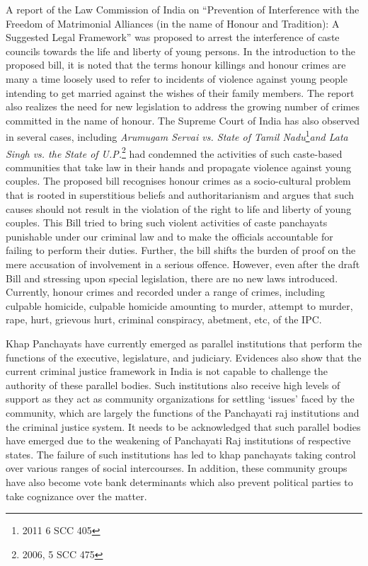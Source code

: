 \begin{multicols}{2}
\noi
A report of the Law Commission of India on “Prevention of Interference with the
Freedom of Matrimonial Alliances (in the name of Honour and Tradition): A Suggested
Legal Framework” was proposed to arrest the interference of caste councils towards the
life and liberty of young persons. In the introduction to the proposed bill, it is noted that
the terms honour killings and honour crimes are many a time loosely used to refer to
incidents of violence against young people intending to get married against the wishes
of their family members. The report also realizes the need for new legislation to address
the growing number of crimes committed in the name of honour. The Supreme Court
of India has also observed in several cases, including \textit{Arumugam Servai vs. State of
Tamil Nadu}\footnote{ 2011 6 SCC 405}\textit{and Lata Singh vs. the State of U.P.}\footnote{2006, 5 SCC 475} had condemned the activities of such
caste-based communities that take law in their hands and propagate violence against
young couples. The proposed bill recognises honour crimes as a socio-cultural problem
that is rooted in superstitious beliefs and authoritarianism and argues that such causes
should not result in the violation of the right to life and liberty of young couples. This
Bill tried to bring such violent activities of caste panchayats punishable under our
criminal law and to make the officials accountable for failing to perform their duties.
Further, the bill shifts the burden of proof on the mere accusation of involvement in a
serious offence. However, even after the draft Bill and stressing upon special
legislation, there are no new laws introduced. Currently, honour crimes and recorded
under a range of crimes, including culpable homicide, culpable homicide amounting to
murder, attempt to murder, rape, hurt, grievous hurt, criminal conspiracy, abetment, etc,
of the IPC. 


\noi
Khap Panchayats have currently emerged as parallel institutions that perform the
functions of the executive, legislature, and judiciary. Evidences also show that the
current criminal justice framework in India is not capable to challenge the authority of these parallel bodies. Such institutions also receive high levels of support as they act as
community organizations for settling ‘issues’ faced by the community, which are
largely the functions of the Panchayati raj institutions and the criminal justice system.
It needs to be acknowledged that such parallel bodies have emerged due to the
weakening of Panchayati Raj institutions of respective states. The failure of such
institutions has led to khap panchayats taking control over various ranges of social
intercourses. In addition, these community groups have also become vote bank
determinants which also prevent political parties to take cognizance over the matter.


\end{multicols}
